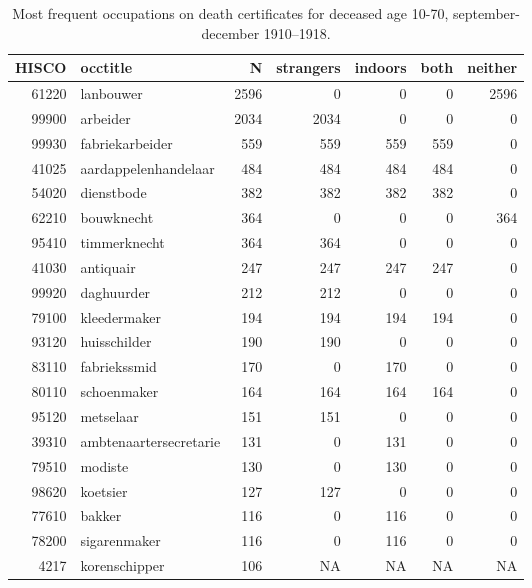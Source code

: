 \begin{table}

\caption{\label{tab:tab:topoccs_selected}Most frequent occupations on death certificates for deceased age 10-70, september-december 1910–1918.}
\centering
\begin{tabular}[t]{r|l|r|r|r|r|r}
\hline
HISCO & occtitle & N & strangers & indoors & both & neither\\
\hline
61220 & lanbouwer & 2596 & 0 & 0 & 0 & 2596\\
\hline
99900 & arbeider & 2034 & 2034 & 0 & 0 & 0\\
\hline
99930 & fabriekarbeider & 559 & 559 & 559 & 559 & 0\\
\hline
41025 & aardappelenhandelaar & 484 & 484 & 484 & 484 & 0\\
\hline
54020 & dienstbode & 382 & 382 & 382 & 382 & 0\\
\hline
62210 & bouwknecht & 364 & 0 & 0 & 0 & 364\\
\hline
95410 & timmerknecht & 364 & 364 & 0 & 0 & 0\\
\hline
41030 & antiquair & 247 & 247 & 247 & 247 & 0\\
\hline
99920 & daghuurder & 212 & 212 & 0 & 0 & 0\\
\hline
79100 & kleedermaker & 194 & 194 & 194 & 194 & 0\\
\hline
93120 & huisschilder & 190 & 190 & 0 & 0 & 0\\
\hline
83110 & fabriekssmid & 170 & 0 & 170 & 0 & 0\\
\hline
80110 & schoenmaker & 164 & 164 & 164 & 164 & 0\\
\hline
95120 & metselaar & 151 & 151 & 0 & 0 & 0\\
\hline
39310 & ambtenaartersecretarie & 131 & 0 & 131 & 0 & 0\\
\hline
79510 & modiste & 130 & 0 & 130 & 0 & 0\\
\hline
98620 & koetsier & 127 & 127 & 0 & 0 & 0\\
\hline
77610 & bakker & 116 & 0 & 116 & 0 & 0\\
\hline
78200 & sigarenmaker & 116 & 0 & 116 & 0 & 0\\
\hline
4217 & korenschipper & 106 & NA & NA & NA & NA\\
\hline
\end{tabular}
\end{table}
